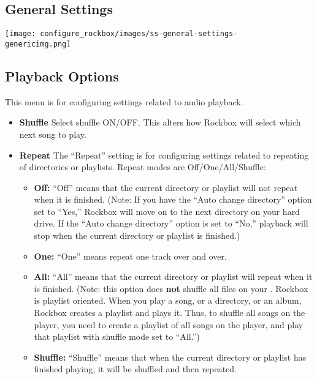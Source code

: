\begin{itemize}
\section{\label{ref:GeneralSettings}General Settings}
\begin{center}
  \texttt{[image: configure\_rockbox/images/ss-general-settings-\\genericimg.png]}
\end{center}

\subsection{\label{ref:PlaybackOptions}Playback Options}
This menu is for configuring settings related to audio playback.

\begin{itemize}
\item \textbf{Shuffle}
  Select shuffle ON/OFF. This alters how Rockbox will select which next song to play.
\item \textbf{Repeat}
  The ``Repeat'' setting is for configuring settings related to repeating of directories or playlists.  Repeat modes are Off/One/All/Shuffle: 
    \begin{itemize}
    \item \textbf{Off:  }``Off'' means that the current directory or playlist will not repeat when it is finished.  (Note:  If you have the ``Auto change directory'' option set to ``Yes,'' Rockbox will move on to the next directory on your hard drive.  If the ``Auto change directory'' option is set to ``No,'' playback will stop when the current directory or playlist is finished.)
    \item\textbf{One:  }``One'' means repeat one track over and over.
    \item\textbf{All:  } ``All'' means that the current directory or playlist will repeat when it is finished.  (Note:  this option does \textbf{not} shuffle all files on your \dap.  Rockbox is playlist oriented. When you play a song, or a directory, or an album, Rockbox creates a playlist and plays it. Thus, to shuffle all songs on the player, you need to create a playlist of all songs on the player, and play that playlist with shuffle mode set to ``All.'')
    \item\textbf{Shuffle:  }``Shuffle'' means that when the current directory or playlist has finished playing, it will be shuffled and then repeated.
    \end{itemize}


\end{itemize}
\end{itemize}
